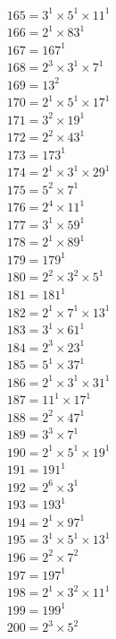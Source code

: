 \begin{equation*}
\begin{aligned}
& 165 = 3^{1} × 5^{1} × 11^{1} \\
& 166 = 2^{1} × 83^{1} \\
& 167 = 167^{1} \\
& 168 = 2^{3} × 3^{1} × 7^{1} \\
& 169 = 13^{2} \\
& 170 = 2^{1} × 5^{1} × 17^{1} \\
& 171 = 3^{2} × 19^{1} \\
& 172 = 2^{2} × 43^{1} \\
& 173 = 173^{1} \\
& 174 = 2^{1} × 3^{1} × 29^{1} \\
& 175 = 5^{2} × 7^{1} \\
& 176 = 2^{4} × 11^{1} \\
& 177 = 3^{1} × 59^{1} \\
& 178 = 2^{1} × 89^{1} \\
& 179 = 179^{1} \\
& 180 = 2^{2} × 3^{2} × 5^{1} \\
& 181 = 181^{1} \\
& 182 = 2^{1} × 7^{1} × 13^{1} \\
& 183 = 3^{1} × 61^{1} \\
& 184 = 2^{3} × 23^{1} \\
& 185 = 5^{1} × 37^{1} \\
& 186 = 2^{1} × 3^{1} × 31^{1} \\
& 187 = 11^{1} × 17^{1} \\
& 188 = 2^{2} × 47^{1} \\
& 189 = 3^{3} × 7^{1} \\
& 190 = 2^{1} × 5^{1} × 19^{1} \\
& 191 = 191^{1} \\
& 192 = 2^{6} × 3^{1} \\
& 193 = 193^{1} \\
& 194 = 2^{1} × 97^{1} \\
& 195 = 3^{1} × 5^{1} × 13^{1} \\
& 196 = 2^{2} × 7^{2} \\
& 197 = 197^{1} \\
& 198 = 2^{1} × 3^{2} × 11^{1} \\
& 199 = 199^{1} \\
& 200 = 2^{3} × 5^{2} \\
\end{aligned}
\end{equation*}
